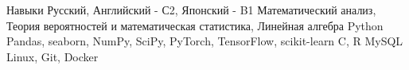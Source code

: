 \begin{rubric}{Навыки}
\entry*[Языки]
	Русский, Английский - С2, Японский - B1
\entry*[Математика]
    Математический анализ, Теория вероятностей и математическая статистика, Линейная алгебра
	Python
        \newline Pandas, seaborn, NumPy, SciPy, PyTorch, TensorFlow, scikit-learn
        \newline C, R
	MySQL
\entry*[Другое]
Linux, Git, Docker
\end{rubric}
